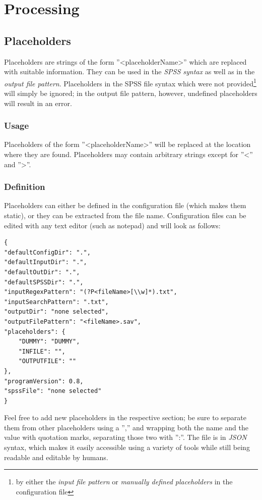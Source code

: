 \documentclass[]{article}
\newcommand{\ph}[1]{{\textless}#1{\textgreater}}
\begin{document}
\section{Processing}
\subsection{Placeholders}
Placeholders are strings of the form ''\ph{placeholderName}'' which are replaced with suitable information. They can be used in the \textit{SPSS syntax} as well as in the \textit{output file pattern}. Placeholders in the SPSS file syntax which were not provided\footnote{by either the \textit{input file pattern} or \textit{manually defined placeholders} in the configuration file} will simply be ignored; in the output file pattern, however, undefined placeholders will result in an error. 

\subsubsection{Usage}
Placeholders of the form ''\ph{placeholderName}'' will be replaced at the location where they are found. Placeholders may contain arbitrary strings except for ''\textless'' and ''\textgreater''. 

\subsubsection{Definition}
Placeholders can either be defined in the configuration file (which makes them static), or they can be extracted from the file name. Configuration files can be edited with any text editor (such as notepad) and will look as follows:
\begin{verbatim}
{
"defaultConfigDir": ".", 
"defaultInputDir": ".", 
"defaultOutDir": ".", 
"defaultSPSSDir": ".", 
"inputRegexPattern": "(?P<fileName>[\\w]*).txt", 
"inputSearchPattern": ".txt", 
"outputDir": "none selected", 
"outputFilePattern": "<fileName>.sav", 
"placeholders": {
    "DUMMY": "DUMMY", 
    "INFILE": "", 
    "OUTPUTFILE": ""
},
"programVersion": 0.8, 
"spssFile": "none selected"
}
\end{verbatim}
Feel free to add new placeholders in the respective section; be sure to separate them from other placeholders using a '','' and wrapping both the name and the value with quotation marks, separating those two with '':''. The file is in \textit{JSON} syntax, which makes it easily accessible using a variety of tools while still being readable and editable by humans. 
\end{document}
